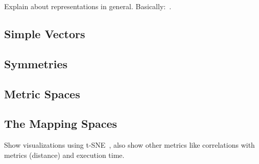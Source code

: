 Explain about representations in general. Basically:~\cite{goens_mcsoc18}.
\subsection{Simple Vectors}

\subsection{Symmetries}

\subsection{Metric Spaces}

\subsection{The Mapping Spaces}
Show visualizations using t-SNE~\cite{tsne}, also show other metrics like
correlations with metrics (distance) and execution time.
